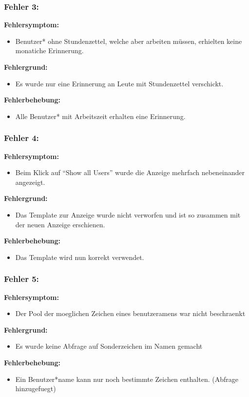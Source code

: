 \subsubsection{Fehler 3:} %
\textbf{Fehlersymptom:}
	\begin{itemize}
		\item Benutzer* ohne Stundenzettel, welche aber arbeiten müssen, erhielten keine monatiche Erinnerung.
	\end{itemize}
\textbf{Fehlergrund:}
	\begin{itemize}
		\item Es wurde nur eine Erinnerung an Leute mit Stundenzettel verschickt.
	\end{itemize}
\textbf{Fehlerbehebung:}
	\begin{itemize}
		\item Alle Benutzer* mit Arbeitszeit erhalten eine Erinnerung.
	\end{itemize}

\subsubsection{Fehler 4:} %
\textbf{Fehlersymptom:}
	\begin{itemize}
		\item Beim Klick auf "`Show all Users"' wurde die Anzeige mehrfach nebeneinander angezeigt.
	\end{itemize}
\textbf{Fehlergrund:}
	\begin{itemize}
		\item Das Template zur Anzeige wurde nicht verworfen und ist so zusammen mit der neuen Anzeige erschienen.%
	\end{itemize}
\textbf{Fehlerbehebung:}
	\begin{itemize}
		\item Das Template wird nun korrekt verwendet.
	\end{itemize}
	
\subsubsection{Fehler 5:} %
\textbf{Fehlersymptom:}
	\begin{itemize}
		\item Der Pool der moeglichen Zeichen eines benutzeramens war nicht beschraenkt
	\end{itemize}
\textbf{Fehlergrund:}
	\begin{itemize}
		\item Es wurde keine Abfrage auf Sonderzeichen im Namen gemacht 
	\end{itemize}
\textbf{Fehlerbehebung:}
	\begin{itemize}
		\item Ein Benutzer*name kann nur noch bestimmte Zeichen enthalten. (Abfrage hinzugefuegt)
	\end{itemize}

